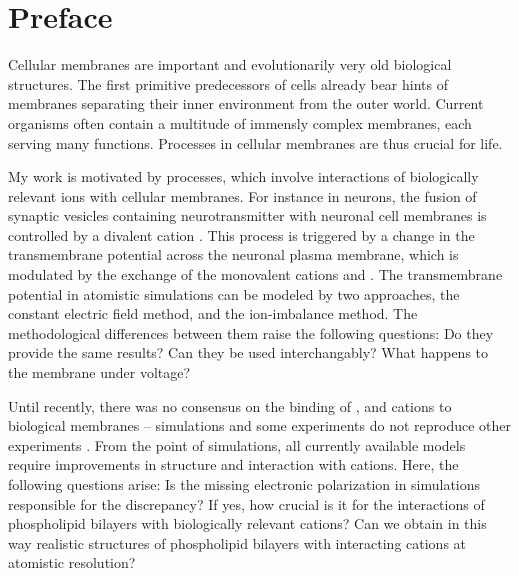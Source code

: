 \chapter*{Preface}

Cellular membranes are important and evolutionarily very old biological structures. 
\citep{MolBiolCell} 
The first primitive predecessors of cells already bear hints of membranes 
separating their inner environment from the outer world. 
Current organisms often contain a multitude of immensly complex membranes, 
each serving many functions. 
Processes in cellular membranes are thus crucial for life. 

My work is motivated by processes,
which involve interactions of biologically relevant ions with cellular membranes. 
For instance in neurons, 
the fusion of synaptic vesicles containing neurotransmitter with neuronal cell membranes 
is controlled by a divalent cation . \citep{Berridge2003, Clapham2007}
This process is triggered by a change in 
the transmembrane potential across the neuronal plasma membrane,
which is modulated by the exchange of the monovalent cations  and . \citep{Knudsen_book2002}
The transmembrane potential in atomistic simulations can be modeled by two approaches, 
the constant electric field method, 
and the ion-imbalance method. 
The methodological differences between them raise the following questions:
Do they provide the same results? 
Can they be used interchangably?
What happens to the membrane under voltage?

Until recently,
there was no consensus on the binding of 
,  and  cations
to biological membranes -- 
simulations and some experiments   \citep{berkowitz12, vacha09a, harb13}
do not reproduce other experiments \citep{roux90, pabst07, akutsu81}. 
From the point of simulations,
all currently available models 
require improvements in structure and interaction with cations. 
Here, the following questions arise:
Is the missing electronic polarization in simulations responsible for the discrepancy?
If yes, how crucial is it for the interactions of phospholipid bilayers with biologically relevant cations?
Can we obtain in this way realistic structures of phospholipid bilayers with interacting cations at atomistic resolution?


